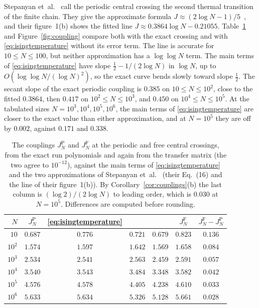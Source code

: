 Stepanyan et~al.\@~\cite[Section~III.B]{stepanyan2024} call the periodic
central crossing the second thermal transition of the finite chain. They
give the approximate formula $J\approx(2\log N-1)/5$~\cite[Eq.~(16)]{stepanyan2024},
and their figure~1(b) shows the fitted line $J\approx0.3864\log N-0.21055$.
Table~\ref{tab:couplings} and Figure~\ref{fig:coupling} compare both with the
exact crossing and with \eqref{eq:isingtemperature} without its error term. The line is accurate for
$10\le N\le100$, but neither approximation has a $\log\log N$ term. The main
terms of \eqref{eq:isingtemperature} have slope $\frac12-1/(2\log N)$ in
$\log N$, up to $O(\log\log N/(\log N)^2)$, so the exact curve bends slowly
toward slope $\frac12$. The secant slope of the exact periodic coupling is
$0.385$ on $10\le N\le10^2$, close
to the fitted $0.3864$, then $0.417$ on $10^2\le N\le10^3$, and $0.450$ on
$10^4\le N\le10^5$. At the tabulated sizes $N=10^3,10^4,10^5,10^6$, the main terms of
\eqref{eq:isingtemperature} are closer to the exact value than either
approximation, and at $N=10^5$ they are off by $0.002$, against $0.171$ and
$0.338$.

\begin{table}[t]
\centering
\small
\begin{tabular}{rcccccc}
\toprule
$N$ & $J_N^{\mathrm P}$ & \eqref{eq:isingtemperature} & \cite[(16)]{stepanyan2024} &
\cite[figure~1(b)]{stepanyan2024} & $J_N^{\mathrm F}$ & $J_N^{\mathrm F}-J_N^{\mathrm P}$\\
\midrule
$10$ & $0.687$ & $0.776$ & $0.721$ & $0.679$ & $0.823$ & $0.136$\\
$10^2$ & $1.574$ & $1.597$ & $1.642$ & $1.569$ & $1.658$ & $0.084$\\
$10^3$ & $2.534$ & $2.541$ & $2.563$ & $2.459$ & $2.591$ & $0.057$\\
$10^4$ & $3.540$ & $3.543$ & $3.484$ & $3.348$ & $3.582$ & $0.042$\\
$10^5$ & $4.576$ & $4.578$ & $4.405$ & $4.238$ & $4.610$ & $0.033$\\
$10^6$ & $5.633$ & $5.634$ & $5.326$ & $5.128$ & $5.661$ & $0.028$\\
\bottomrule
\end{tabular}
\caption{The couplings $J_N^{\mathrm P}$ and $J_N^{\mathrm F}$ at the
periodic and free central crossings, from the exact run polynomials and again
from the transfer matrix (the two agree to $10^{-12}$), against
the main terms of \eqref{eq:isingtemperature} and the two approximations of
Stepanyan et~al.~\cite{stepanyan2024} (their Eq.~(16) and the line of their
figure~1(b)). By Corollary~\ref{cor:couplings}(b) the last column is
$(\log2)/(2\log N)$ to leading order, which is $0.030$ at $N=10^5$.
Differences are computed before rounding.}
\label{tab:couplings}
\end{table}

